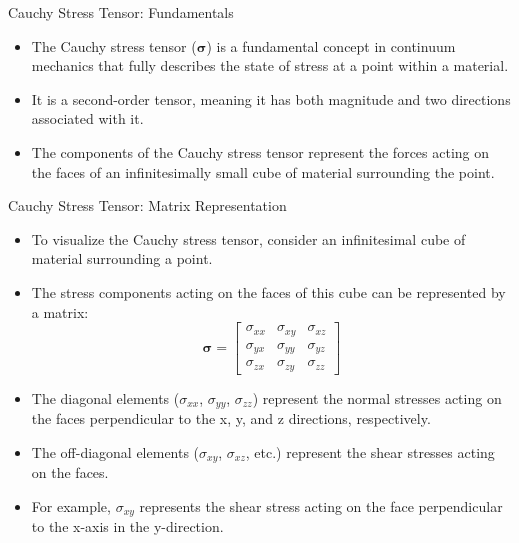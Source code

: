 \documentclass{beamer}
\begin{document}
\begin{frame}{Cauchy Stress Tensor: Fundamentals}
    \begin{itemize}
        \item The Cauchy stress tensor ($\boldsymbol{\sigma}$) is a fundamental concept in continuum mechanics that fully describes the state of stress at a point within a material.
        \item It is a second-order tensor, meaning it has both magnitude and two directions associated with it.
        \item The components of the Cauchy stress tensor represent the forces acting on the faces of an infinitesimally small cube of material surrounding the point.
    \end{itemize}
\end{frame}

\begin{frame}{Cauchy Stress Tensor: Matrix Representation}
    \begin{itemize}
        \item To visualize the Cauchy stress tensor, consider an infinitesimal cube of material surrounding a point.
        \item The stress components acting on the faces of this cube can be represented by a matrix:
        \begin{equation*}
            \boldsymbol{\sigma} = \begin{bmatrix} \sigma_{xx} & \sigma_{xy} & \sigma_{xz} \\ \sigma_{yx} & \sigma_{yy} & \sigma_{yz} \\ \sigma_{zx} & \sigma_{zy} & \sigma_{zz} \end{bmatrix}
        \end{equation*}
        \item The diagonal elements ($\sigma_{xx}$, $\sigma_{yy}$, $\sigma_{zz}$) represent the normal stresses acting on the faces perpendicular to the x, y, and z directions, respectively.
        \item The off-diagonal elements ($\sigma_{xy}$, $\sigma_{xz}$, etc.) represent the shear stresses acting on the faces.
        \item For example, $\sigma_{xy}$ represents the shear stress acting on the face perpendicular to the x-axis in the y-direction.
    \end{itemize}
\end{frame}
\end{document}
